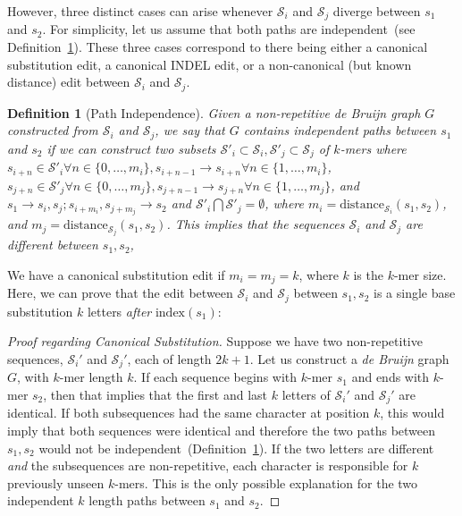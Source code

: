\documentclass[11pt]{article}
\newtheorem{defn}{Definition}
\begin{document}
However, three distinct cases can arise whenever $\mathcal{S}_i$ and $\mathcal{S}_j$ diverge between
$s_1$ and $s_2$. For simplicity, let us assume that both paths are independent~(see
Definition~\ref{defn:path-independence}). These three cases correspond to there being either a canonical
substitution edit, a canonical INDEL edit, or a non-canonical (but known distance) edit between
$\mathcal{S}_i$ and $\mathcal{S}_j$.

\begin{defn}[Path Independence]
\label{defn:path-independence}
Given a non-repetitive \emph{de Bruijn} graph $G$ constructed from $\mathcal{S}_i$ and $\mathcal{S}_j$, we say
that $G$ contains independent paths between $s_1$ and $s_2$ if we can construct two subsets
$\mathcal{S}'_i \subset \mathcal{S}_i, \mathcal{S}'_j \subset \mathcal{S}_j$ of $k$-mers where $s_{i + n}
\in \mathcal{S}'_i \forall n \in \{0, \dots, m_i\}, s_{i + n - 1} \rightarrow s_{i + n} \forall n \in \{1, \dots, m_i\}$,
$s_{j + n} \in \mathcal{S}'_j \forall n \in \{0, \dots, m_j\}, s_{j + n - 1} \rightarrow s_{j + n} \forall n \in \{1,
\dots, m_j\}$, and $s_1 \rightarrow s_i, s_j; s_{i + m_i}, s_{j + m_j} \rightarrow s_2$ and $\mathcal{S}'_i
\bigcap \mathcal{S}'_j = \emptyset$, where $m_i = \text{distance}_{\mathcal{S}_i}(s_1, s_2)$, and $m_j =
\text{distance}_{\mathcal{S}_j}(s_1, s_2)$. This implies that the sequences $\mathcal{S}_i$ and
$\mathcal{S}_j$ are different between $s_1, s_2$,
\end{defn}

We have a canonical substitution edit if $m_i = m_j = k$, where $k$ is the $k$-mer size. Here, we can
prove that the edit between $\mathcal{S}_i$ and $\mathcal{S}_j$ between $s_1, s_2$ is a single base
substitution $k$ letters \emph{after} $\text{index}(s_1)$:

\begin{proof}[Proof regarding Canonical Substitution]
\label{proof:canonical-substitution}
Suppose we have two non-repetitive sequences, $\mathcal{S}_i'$ and $\mathcal{S}_j'$, each of length
$2k + 1$. Let us construct a \emph{de Bruijn} graph $G$, with $k$-mer length $k$. If each sequence begins with
$k$-mer $s_1$ and ends with $k$-mer $s_2$, then that implies that the first and last $k$ letters of
$\mathcal{S}_i'$ and $\mathcal{S}_j'$ are identical. If both subsequences had the same character at
position $k$, this would imply that both sequences were identical and therefore the two paths between
$s_1, s_2$ would not be independent~(Definition~\ref{defn:path-independence}). If the two letters are
different \emph{and} the subsequences are non-repetitive, each character is responsible for $k$
previously unseen $k$-mers. This is the only possible explanation for the two independent $k$ length
paths between $s_1$ and $s_2$.
\end{proof}
\end{document}
